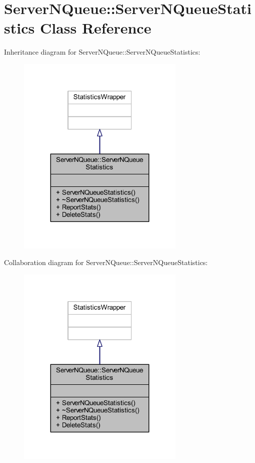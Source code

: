 \hypertarget{class_server_n_queue_1_1_server_n_queue_statistics}{}\section{Server\+N\+Queue\+:\+:Server\+N\+Queue\+Statistics Class Reference}
\label{class_server_n_queue_1_1_server_n_queue_statistics}


Inheritance diagram for Server\+N\+Queue\+:\+:Server\+N\+Queue\+Statistics\+:\nopagebreak
\begin{figure}[H]
\begin{center}
\leavevmode
\includegraphics[width=227pt]{class_server_n_queue_1_1_server_n_queue_statistics__inherit__graph}
\end{center}
\end{figure}


Collaboration diagram for Server\+N\+Queue\+:\+:Server\+N\+Queue\+Statistics\+:\nopagebreak
\begin{figure}[H]
\begin{center}
\leavevmode
\includegraphics[width=227pt]{class_server_n_queue_1_1_server_n_queue_statistics__coll__graph}
\end{center}
\end{figure}
